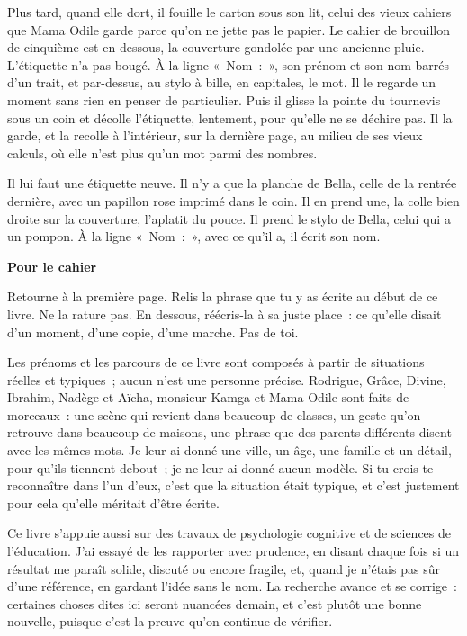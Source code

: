 \documentclass[10.5pt,twoside,openright]{book}
\newenvironment{pourcahier}[1]{\par\vspace{0.9em}\begin{tcolorbox}[colback=black!4,colframe=accent,boxrule=0pt,leftrule=2.2pt,arc=0pt,left=8pt,right=8pt,top=5pt,bottom=5pt]\small\textbf{#1}\par\smallskip}{\end{tcolorbox}\par}
\newcommand{\chapitresn}[1]{\cleardoublepage\markright{#1}\thispagestyle{plain}\vspace*{2.8cm}{\noindent\LARGE\bfseries #1\par}\vspace{1.6em}\noindent\ignorespaces}
\begin{document}
Plus tard, quand elle dort, il fouille le carton sous son lit, celui des vieux cahiers que Mama Odile garde parce qu’on ne jette pas le papier. Le cahier de brouillon de cinquième est en dessous, la couverture gondolée par une ancienne pluie. L’étiquette n’a pas bougé. À la ligne « Nom : », son prénom et son nom barrés d’un trait, et par-dessus, au stylo à bille, en capitales, le mot. Il le regarde un moment sans rien en penser de particulier. Puis il glisse la pointe du tournevis sous un coin et décolle l’étiquette, lentement, pour qu’elle ne se déchire pas. Il la garde, et la recolle à l’intérieur, sur la dernière page, au milieu de ses vieux calculs, où elle n’est plus qu’un mot parmi des nombres.

Il lui faut une étiquette neuve. Il n’y a que la planche de Bella, celle de la rentrée dernière, avec un papillon rose imprimé dans le coin. Il en prend une, la colle bien droite sur la couverture, l’aplatit du pouce. Il prend le stylo de Bella, celui qui a un pompon. À la ligne « Nom : », avec ce qu’il a, il écrit son nom.

\begin{pourcahier}{Pour le cahier}
Retourne à la première page. Relis la phrase que tu y as écrite au début de ce livre. Ne la rature pas. En dessous, réécris-la à sa juste place : ce qu’elle disait d’un moment, d’une copie, d’une marche. Pas de toi.
\end{pourcahier}


\chapitresn{Note de l’auteur}

Les prénoms et les parcours de ce livre sont composés à partir de situations réelles et typiques ; aucun n’est une personne précise. Rodrigue, Grâce, Divine, Ibrahim, Nadège et Aïcha, monsieur Kamga et Mama Odile sont faits de morceaux : une scène qui revient dans beaucoup de classes, un geste qu’on retrouve dans beaucoup de maisons, une phrase que des parents différents disent avec les mêmes mots. Je leur ai donné une ville, un âge, une famille et un détail, pour qu’ils tiennent debout ; je ne leur ai donné aucun modèle. Si tu crois te reconnaître dans l’un d’eux, c’est que la situation était typique, et c’est justement pour cela qu’elle méritait d’être écrite.

Ce livre s’appuie aussi sur des travaux de psychologie cognitive et de sciences de l’éducation. J’ai essayé de les rapporter avec prudence, en disant chaque fois si un résultat me paraît solide, discuté ou encore fragile, et, quand je n’étais pas sûr d’une référence, en gardant l’idée sans le nom. La recherche avance et se corrige : certaines choses dites ici seront nuancées demain, et c’est plutôt une bonne nouvelle, puisque c’est la preuve qu’on continue de vérifier.
\end{document}
